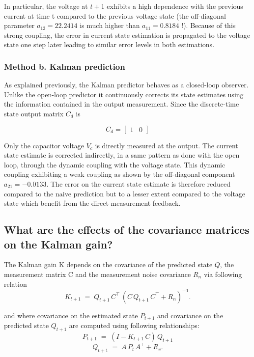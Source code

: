 In particular, the voltage at $t+1$ exhibits a high dependence with the previous current at time t compared to the previous voltage state (the off-diagonal parameter $a_{12} = 22.2414$ is much higher than $a_{11} = 0.8184$ !).
Because of this strong coupling, the error in current state estimation is propagated to the voltage state one step later leading to similar error levels in both estimations.

\subsubsection{Method b. Kalman prediction}

As explained previously, the Kalman predictor behaves as a closed-loop observer.  Unlike the open-loop predictor it continuously corrects its state estimates using the information contained in the output measurement.
Since the discrete-time state output matrix $C_d$ is 

\begin{equation}
C_d = \begin{bmatrix}
1 & 0 
\end{bmatrix}
\end{equation}

Only the capacitor voltage $V_c$ is directly measured at the output.  The current state estimate is corrected indirectly, in a same pattern as done with the open loop, through the dynamic coupling with the voltage state.
This dynamic coupling exhibiting a weak coupling as shown by the off-diagonal component $a_{21} = -0.0133$. The error on the current state estimate is therefore reduced compared to the naive prediction but to a lesser extent compared to the voltage state which benefit from the direct measurement feedback.

\subsection{What are the effects of the covariance matrices on the Kalman gain?}

The Kalman gain K depends on the covariance of the predicted state \(Q\), the measurement matrix C and the measurement noise covariance \(R_n\) via following relation
\[
K_{t+1} \;=\; Q_{t+1}\,C^\top\,(C\,Q_{t+1}\,C^\top + R_n)^{-1}.
\]

and where covariance on the estimated state \(P_{t+1}\) and covariance on the predicted state \(Q_{t+1}\) are computed using following relationships:
\[
P_{t+1} \;=\; (I - K_{t+1}\,C)\,Q_{t+1} 
\]
\[
Q_{t+1} \;=\; A\,P_t\,A^\top + R_v.
\]

